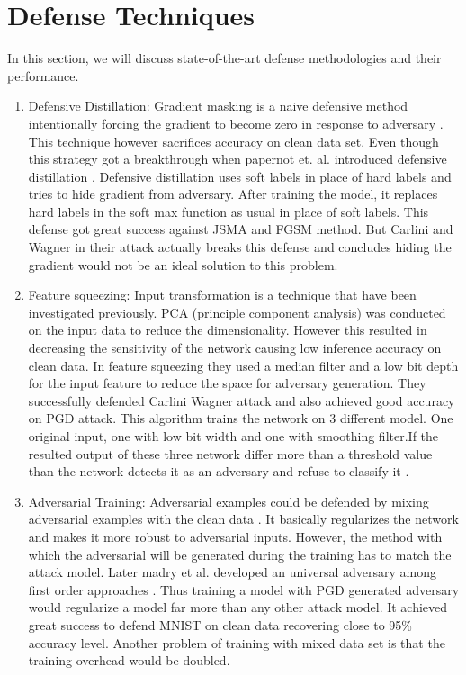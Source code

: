 \documentclass[conference]{IEEEtran}
\begin{document}
\section{Defense Techniques}
In this section, we will discuss state-of-the-art defense methodologies and their performance.
\begin{enumerate}
\item Defensive Distillation: Gradient masking is a naive defensive method intentionally forcing the gradient to become zero in response to adversary \cite{gu2014towards}. This technique however sacrifices accuracy on clean data set. Even though this strategy got a breakthrough when papernot et. al. introduced defensive distillation \cite{papernot2016distillation}. Defensive distillation uses soft labels in place of hard labels and tries to hide gradient from adversary. After training the model, it replaces hard labels in the soft max function as usual in place of soft labels. This defense got great success against JSMA and FGSM method. But Carlini and Wagner \cite{carlini2016defensive} in their attack actually breaks this defense and concludes hiding the gradient would not be an ideal solution to this problem. 
\item Feature squeezing: Input transformation is a technique that have been investigated previously. PCA (principle component analysis) was conducted on the input data \cite{bhagoji2017dimensionality} to reduce the dimensionality. However this resulted in decreasing the sensitivity of the network causing low inference accuracy on clean data. In feature squeezing they used a median filter and a low bit depth for the input feature to reduce the space for adversary generation. They successfully defended Carlini Wagner attack and also achieved good accuracy on PGD attack. This algorithm trains the network on 3 different model. One original input, one with low bit width and one with smoothing filter.If the resulted output of these three network differ more than a threshold value than the network detects it as an adversary and refuse to classify it \cite{xu2017feature}.
\item Adversarial Training: Adversarial examples could be defended by mixing adversarial examples with the clean data \cite{szegedy2013intriguing}. It basically regularizes the network and makes it more robust to adversarial inputs. However, the method with which the adversarial will be generated during the training has to match the attack model. Later madry et al. developed an universal adversary among first order approaches \cite{mkadry2017towards}. Thus training a model with PGD generated adversary would regularize a model far more than any other attack model. It achieved great success to defend MNIST on clean data recovering close to 95\% accuracy level. Another problem of training with mixed data set is that the training overhead would be doubled.

\end{enumerate}
\end{document}
